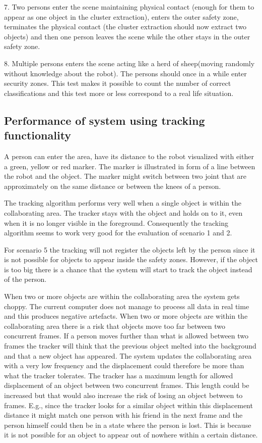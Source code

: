 7. Two persons enter the scene maintaining physical contact (enough for them to appear as one object in the cluster extraction), enters the outer safety zone, terminates the physical contact (the cluster extraction should now extract two objects) and then one person leaves the scene while the other stays in the outer safety zone.

8. Multiple persons enters the scene acting like a herd of sheep(moving randomly without knowledge about the robot). The persons should once in a while enter security zones. This test makes it possible to count the number of correct classifications and this test more or less correspond to a real life situation. 

\subsection{Performance of system using tracking functionality}
A person can enter the area, have its distance to the robot visualized with either a green, yellow or red marker.
The marker is illustrated in form of a line between the robot and the object.
The marker might switch between two joint that are approximately on the same distance or between the knees of a person. 

The tracking algorithm performs very well when a single object is within the collaborating area.
The tracker stays with the object and holds on to it, even when it is no longer visible in the foreground. 
Consequently the tracking algorithm seems to work very good for the evaluation of scenario 1 and 2.

For scenario 5 the tracking will not register the objects left by the person since it is not possible for objects to appear inside the safety zones. However, if the object is too big there is a chance that the system will start to track the object instead of the person. 

When two or more objects are within the collaborating area the system gets choppy.
The current computer does not manage to process all data in real time and this produces negative artefacts.
When two or more objects are within the collaborating area there is a risk that objects move too far between two concurrent frames.
If a person moves further than what is allowed between two frames the tracker will think that the previous object melted into the background and that a new object has appeared.
The system updates the collaborating area with a very low frequency and the displacement could therefore be more than what the tracker tolerates.
The tracker has a maximum length for allowed displacement of an object between two concurrent frames.
This length could be increased but that would also increase the risk of losing an object between to frames.
E.g., since the tracker looks for a similar object within this displacement distance it might match one person with his friend in the next frame and the person himself could then be in a state where the person is lost. 
This is because it is not possible for an object to appear out of nowhere within a certain distance.\\

